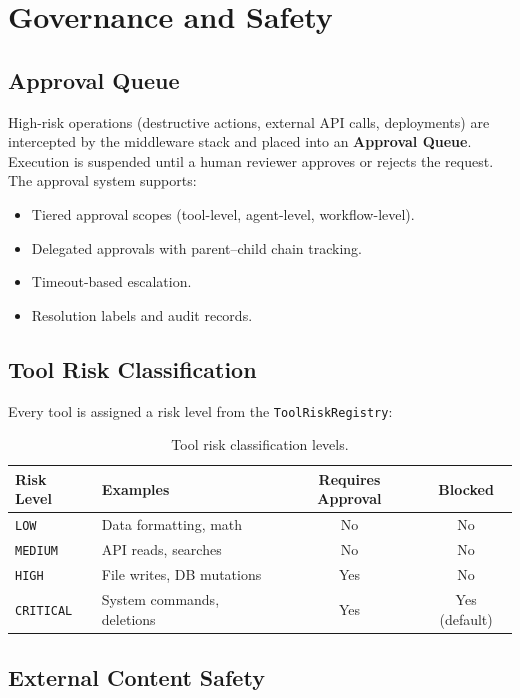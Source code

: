 \documentclass[11pt,a4paper]{article}
\begin{document}
\section{Governance and Safety}
\label{sec:governance}

\subsection{Approval Queue}

High-risk operations (destructive actions, external API calls, deployments) are intercepted by the middleware stack and placed into an \textbf{Approval Queue}.
Execution is suspended until a human reviewer approves or rejects the request.
The approval system supports:
\begin{itemize}
  \item Tiered approval scopes (tool-level, agent-level, workflow-level).
  \item Delegated approvals with parent--child chain tracking.
  \item Timeout-based escalation.
  \item Resolution labels and audit records.
\end{itemize}

\subsection{Tool Risk Classification}

Every tool is assigned a risk level from the \texttt{ToolRiskRegistry}:

\begin{table}[h]
\centering
\small
\begin{tabular}{llcc}
\toprule
\textbf{Risk Level} & \textbf{Examples} & \textbf{Requires Approval} & \textbf{Blocked} \\
\midrule
\texttt{LOW} & Data formatting, math & No & No \\
\texttt{MEDIUM} & API reads, searches & No & No \\
\texttt{HIGH} & File writes, DB mutations & Yes & No \\
\texttt{CRITICAL} & System commands, deletions & Yes & Yes (default) \\
\bottomrule
\end{tabular}
\caption{Tool risk classification levels.}
\label{tab:risk}
\end{table}

\subsection{External Content Safety}
\end{document}
